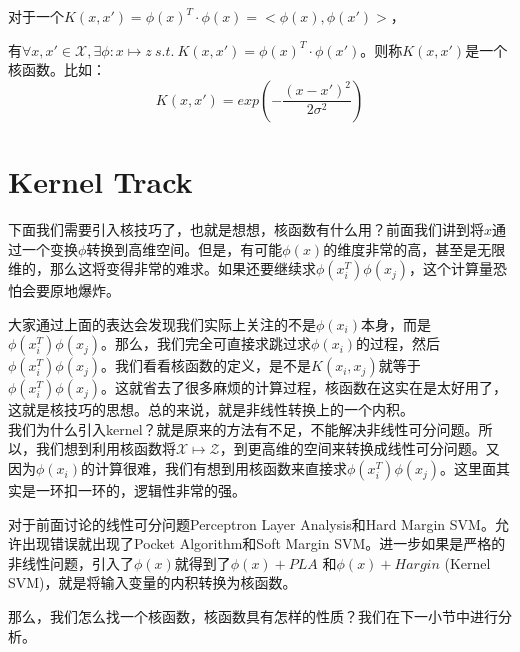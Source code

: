 \documentclass[a4paper]{article}
\begin{document}
对于一个$K(x,x')=\phi(x)^T\cdot\phi(x)=<\phi(x),\phi(x')>$，

有$\forall x,x' \in \mathcal{X},\exists\phi:x\mapsto z \ s.t. \ K(x,x') = \phi(x)^T\cdot \phi(x')$。则称$K(x,x')$是一个核函数。比如：
\begin{equation}
    K(x,x')=exp(-\frac{(x-x')^2}{2\sigma^2})
\end{equation}

\section{Kernel Track}
下面我们需要引入核技巧了，也就是想想，核函数有什么用？前面我们讲到将$x$通过一个变换$\phi$转换到高维空间。但是，有可能$\phi(x)$的维度非常的高，甚至是无限维的，那么这将变得非常的难求。如果还要继续求$\phi(x_i^T)\phi(x_j)$，这个计算量恐怕会要原地爆炸。

大家通过上面的表达会发现我们实际上关注的不是$\phi(x_i)$本身，而是$\phi(x_i^T)\phi(x_j)$。那么，我们完全可直接求跳过求$\phi(x_i)$的过程，然后$\phi(x_i^T)\phi(x_j)$。我们看看核函数的定义，是不是$K(x_i,x_j)$就等于$\phi(x_i^T)\phi(x_j)$。这就省去了很多麻烦的计算过程，核函数在这实在是太好用了，这就是核技巧的思想。总的来说，就是非线性转换上的一个内积。
~\\

我们为什么引入kernel？就是原来的方法有不足，不能解决非线性可分问题。所以，我们想到利用核函数将$\mathcal{X}\mapsto\mathcal{Z}$，到更高维的空间来转换成线性可分问题。又因为$\phi(x_i)$的计算很难，我们有想到用核函数来直接求$\phi(x_i^T)\phi(x_j)$。这里面其实是一环扣一环的，逻辑性非常的强。

对于前面讨论的线性可分问题Perceptron Layer Analysis和Hard Margin SVM。允许出现错误就出现了Pocket Algorithm和Soft Margin SVM。进一步如果是严格的非线性问题，引入了$\phi(x)$就得到了$\phi(x)+PLA$
和$\phi(x)+Hargin$ (Kernel SVM)，就是将输入变量的内积转换为核函数。

那么，我们怎么找一个核函数，核函数具有怎样的性质？我们在下一小节中进行分析。
\end{document}
